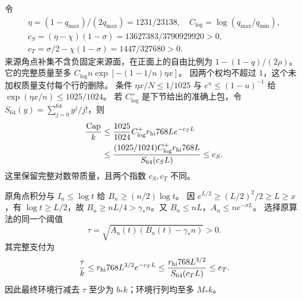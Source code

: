 \documentclass[UTF8,a4paper,11pt,fontset=fandol]{ctexart}
\theoremstyle{remark}
\begin{document}
令
\begin{equation}\label{eq:cantelli-rates}
\begin{gathered}
 \eta=(1-q_{\max})/(2q_{\max})=1231/23138,\quad
 C_{\log}=\log(q_{\max}/q_{\min}),\\
 c_S=(\eta-\chi)(1-\sigma)=13627383/3790929920>0,\\
 c_T=\sigma/2-\chi(1-\sigma)=1447/327680>0.
\end{gathered}
\end{equation}
来源角点补集不含负固定来源面，在正面上的自由比例为
$1-(1-q)/(2\rho)$。它的完整质量至多
$C_{\log}n\exp[-(1-1/n)\eta x]$。
因两个权均不超过 $1$，这个未加权质量支付每个行的删除。
条件 $\eta x/N\le1/1025$ 与 $e^u\le(1-u)^{-1}$ 给
$\exp(\eta x/n)\le1025/1024$。
若 $C_{\log}^+$ 是下节给出的准确上包，令 $S_{64}(y)=\sum_{j=0}^{64}y^j/j!$，则
\begin{equation}\label{eq:cantelli-cappay}
 \begin{aligned}
 \frac{\mathrm{Cap}}k&\le\frac{1025}{1024}C_{\log}^+r_{\rm hi}768L e^{-c_SL}\\
 &\le\frac{(1025/1024)C_{\log}^+r_{\rm hi}768L}{S_{64}(c_SL)}\le e_S.
 \end{aligned}
\end{equation}
这里保留完整对数带质量，且两个指数 $c_S,c_T$ 不同。

原角点积分与 $I_n\le\log t$ 给 $B_n\ge(n/2)\log t$。
因 $e^{L/2}\ge(L/2)^2/2\ge L\ge x$，有 $\log t\ge L/2$，故
$B_n\ge nL/4>\gamma_*n$。又 $B_n\le nL$，$A_n\le ne^{-\sigma L}$。
选择原算法的同一个阈值
\[
 \tau=\sqrt{A_n(t)(B_n(t)-\gamma_*n)}>0.
\]
其完整支付为
\begin{equation}\label{eq:cantelli-taupay}
 \frac\tau k\le r_{\rm hi}768L^{3/2}e^{-c_TL}
 \le\frac{r_{\rm hi}768L^{3/2}}{S_{64}(c_TL)}\le e_T.
\end{equation}
因此最终环境行减去 $\tau$ 至少为 $b_*k$；环境行列均至多 $M_*k$。
\end{document}
